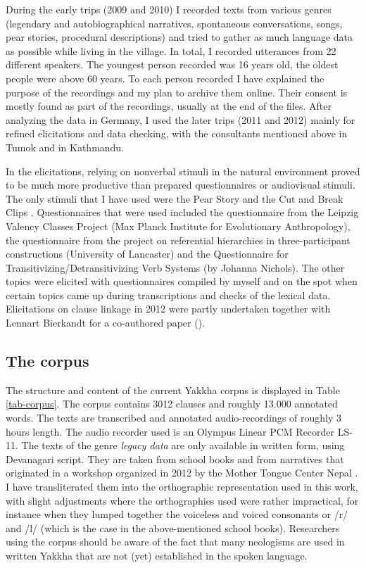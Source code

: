  
During the early trips (2009 and 2010) I recorded texts from various genres (legendary and autobiographical narratives, spontaneous conversations, songs, pear stories, procedural descriptions) and tried to gather as much language data as possible while living in the village. In total, I recorded utterances from 22 different speakers. The youngest person recorded was 16 years old, the oldest people were above 60 years. To each person recorded I have explained the purpose of the recordings and my plan to archive them online. Their consent is mostly found as part of the recordings, usually at the end of the files.  After analyzing the data in Germany, I used the later trips (2011 and 2012) mainly for refined elicitations and data checking, with the consultants mentioned above in Tumok and in Kathmandu. 

In the elicitations, relying on nonverbal stimuli in the natural environment proved to be much more productive than prepared questionnaires or audiovisual stimuli. The only stimuli that I have used were the Pear Story \citep{Chafe1980The-Pear} and the Cut and Break Clips \citep{Bohnemeyeretal2010_cut}. Questionnaires that were used included the questionnaire from the Leipzig Valency Classes Project (Max Planck Institute for Evolutionary Anthropology), the questionnaire from the project on referential hierarchies in three-participant constructions (University of Lancaster) and the Questionnaire for Transitivizing/Detransitivizing Verb Systems (by Johanna Nichols). The other topics were elicited with questionnaires compiled by myself and on the spot when certain topics came up during transcriptions and checks of the lexical data. Elicitations on clause linkage in 2012 were partly undertaken together with Lennart Bierkandt for a co-authored paper (\citet{Bierkandtetal_Scope}).

\subsection{The corpus}\label{corpus}

The structure and content of the current Yakkha corpus is displayed in Table \ref{tab-corpus}. The corpus contains 3012 clauses and roughly 13.000 annotated words. The texts are transcribed and annotated audio-recordings of roughly 3 hours length. The audio recorder used is an Olympus Linear PCM Recorder LS-11. The texts of the genre \emph{legacy data} are only available in written form, using Devanagari script. They are taken from school books \citep{Jimi2009Engka-Yakkha, Jimi2010Engka-Yakkha} and from narratives that originated in a workshop organized in 2012 by the Mother Tongue Center Nepal \citep{Jimee2012_Casuwa, Jimee2012_Owl, Linkha2012_Ashes}. I have transliterated them into the orthographic representation used in this work, with slight adjustments where the orthographies used  were rather impractical, for instance when they lumped together the voiceless and voiced consonants or /r/ and /l/ (which is the case in the above-mentioned school books). Researchers using the corpus should be aware of the fact that many neologisms are used in written Yakkha that are not (yet) established in the spoken language. 




